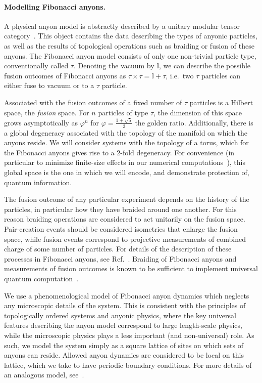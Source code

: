 \documentclass[aps, prl, letterpaper, twocolumn, superscriptaddress, notitlepage, 10pt]{revtex4-1}
\begin{document}
\paragraph{Modelling Fibonacci anyons.}

A physical anyon model is abstractly described by a unitary modular tensor category~\cite{Wang2010b}. This object contains the data describing the types of anyonic particles, as well as the results of topological operations such as braiding or fusion of these anyons. The Fibonacci anyon model consists of only one non-trivial particle type, conventionally called $\tau$. Denoting the vacuum by $\mathbb{I}$, we can describe the possible fusion outcomes of Fibonacci anyons as $\tau\times\tau=\mathbb{I}+\tau$, i.e.~two $\tau$ particles can either fuse to vacuum or to a $\tau$ particle.

Associated with the fusion outcomes of a fixed number of $\tau$ particles is a Hilbert space, the \emph{fusion} space. For $n$ particles of type $\tau$, the dimension of this space grows asymptotically as $\varphi^n$ for $\varphi=\frac{1+\sqrt{5}}{2}$ the golden ratio. Additionally, there is a global degeneracy associated with the topology of the manifold on which the anyons reside. We will consider systems with the topology of a torus, which for the Fibonacci anyons gives rise to a 2-fold degeneracy. For convenience (in particular to minimize finite-size effects in our numerical computations~\cite{Brell2013}), this global space is the one in which we will encode, and demonstrate protection of, quantum information.
	
The fusion outcome of any particular experiment depends on the history of the particles, in particular how they have braided around one another. For this reason braiding operations are considered to act unitarily on the fusion space. Pair-creation events should be considered isometries that enlarge the fusion space, while fusion events correspond to projective 
measurements of combined charge of some number of particles. For details of the description of these processes in Fibonacci anyons, see Ref.~\cite{Trebst2008}.  Braiding of Fibonacci anyons and measurements of fusion outcomes is known to be sufficient to implement universal quantum computation~\cite{?}.

We use a phenomenological model of Fibonacci anyon dynamics which neglects any microscopic details of the system. This is consistent with the principles of topologically ordered systems and anyonic physics, where the key universal features describing the anyon model correspond to large length-scale physics, while the microscopic physics plays a less 
important (and non-universal) role. As such, we model the system simply as a square lattice of sites on which sets of anyons can reside. Allowed anyon dynamics are considered to be local on this lattice, which we take to have periodic boundary conditions. For more details of an analogous model, see~\cite{Brell2013}.
	
\end{document}
